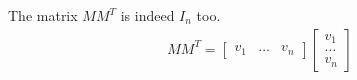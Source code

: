 \documentclass[11pt,reqno,a4paper]{amsart}
\begin{document}
The matrix $M M^T$ is indeed $I_n$ too.
\begin{align*}
    M M^T =
    \left[
    \begin{array}{c|c|c}
        v_1 & \dots & v_n 
    \end{array}
    \right]
    \left[
    \begin{array}{ccc}
        v_1 \\
        \hline
        \dots\\
        \hline
        v_n    
    \end{array}
    \right]
\end{align*}


\endgroup
\end{document}
